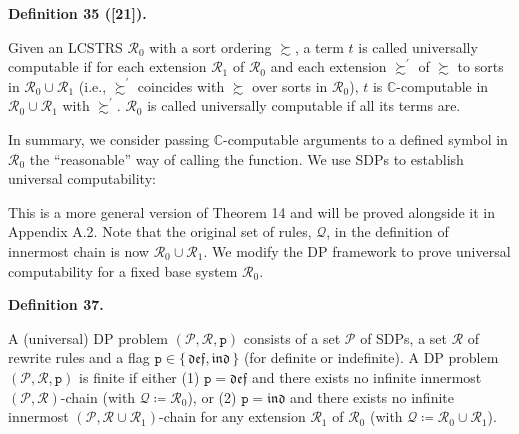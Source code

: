 \documentclass[10pt,a4paper]{amsart}
\providecommand{\coloneq}{\coloneqq}
\begin{document}
 
 
\par\medskip\noindent\textbf{Definition 35 ([21]).}\par
 
 
Given an LCSTRS $\mathcal{R}_{0}$ with a sort ordering $\succsim$, a term $t$ is called universally computable if for each extension $\mathcal{R}_{1}$ of $\mathcal{R}_{0}$ and each extension $\succsim^{\prime}$ of $\succsim$ to sorts in $\mathcal{R}_{0}\cup\mathcal{R}_{1}$ (i.e., $\succsim^{\prime}$ coincides with $\succsim$ over sorts in $\mathcal{R}_{0}$), $t$ is $\mathbb{C}$-computable in $\mathcal{R}_{0}\cup\mathcal{R}_{1}$ with $\succsim^{\prime}$. $\mathcal{R}_{0}$ is called universally computable if all its terms are.\par
 
 
 
 
In summary, we consider passing $\mathbb{C}$-computable arguments to a defined symbol in $\mathcal{R}_{0}$ the “reasonable” way of calling the function. We use SDPs to establish universal computability:\par
 

 
This is a more general version of Theorem 14 and will be proved alongside it in Appendix A.2. Note that the original set of rules, $\mathcal{Q}$, in the definition of innermost chain is now $\mathcal{R}_{0}\cup\mathcal{R}_{1}$. We modify the DP framework to prove universal computability for a fixed base system $\mathcal{R}_{0}$.\par
 
 
 
\par\medskip\noindent\textbf{Definition 37.}\par
 
 
A (universal) DP problem $(\mathcal{P},\mathcal{R},\mathtt{p})$ consists of a set $\mathcal{P}$ of SDPs, a set $\mathcal{R}$ of rewrite rules and a flag $\mathtt{p}\in\{\,\mathfrak{def},\mathfrak{ind}\,\}$ (for definite or indefinite). A DP problem $(\mathcal{P},\mathcal{R},\mathtt{p})$ is finite if either (1) $\mathtt{p}=\mathfrak{def}$ and there exists no infinite innermost $(\mathcal{P},\mathcal{R})$-chain (with $\mathcal{Q}\coloneq\mathcal{R}_{0}$), or (2) $\mathtt{p}=\mathfrak{ind}$ and there exists no infinite innermost $(\mathcal{P},\mathcal{R}\cup\mathcal{R}_{1})$-chain for any extension $\mathcal{R}_{1}$ of $\mathcal{R}_{0}$ (with $\mathcal{Q}\coloneq\mathcal{R}_{0}\cup\mathcal{R}_{1}$).\par
 
\end{document}

